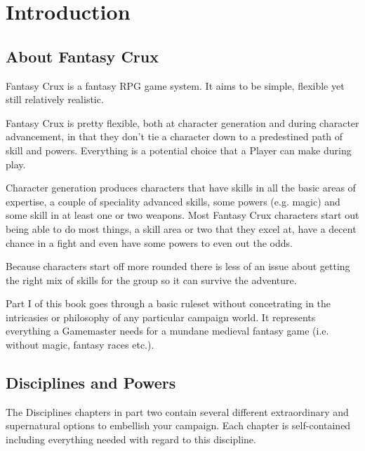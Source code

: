 \chapter{Introduction}
\label{ch:introduction}


\section{About Fantasy Crux}

Fantasy Crux is a fantasy RPG game system. It aims to be simple, flexible yet still relatively realistic. 

Fantasy Crux is pretty flexible, both at character generation and during character advancement, in that they don’t tie a character down to a predestined path of skill and powers. Everything is a potential choice that a Player can make during play.

Character generation produces characters that have skills in all the basic areas of expertise, a couple of speciality advanced skills, some powers (e.g. magic) and some skill in at least one or two weapons. Most Fantasy Crux characters start out being able to do most things, a skill area or two that they excel at, have a decent chance in a fight and even have some powers to even out the odds.

Because characters start off more rounded there is less of an issue about getting the right mix of skills for the group so it can survive the adventure.

Part I of this book goes through a basic ruleset without concetrating in the intricasies or philosophy of any particular campaign world. It represents everything a Gamemaster needs for a mundane medieval fantasy game (i.e. without magic, fantasy races etc.). 


\section{Disciplines and Powers}
The Disciplines chapters in part two contain several different extraordinary and supernatural options to embellish your campaign. Each chapter is self-contained including everything needed with regard to this discipline. 


